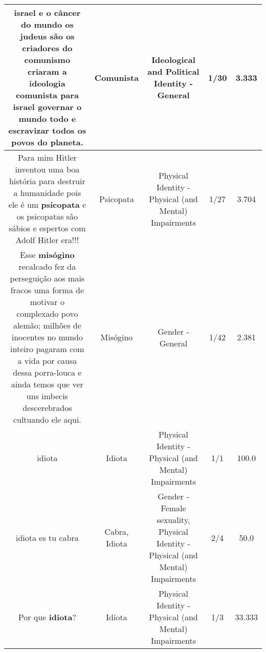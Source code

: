 \documentclass[11pt]{article}
\newlength\mylength
\begin{document}
\begin{center}
\begin{longtable}{|C{.65\mylength}|C{.30\mylength}|C{.12\mylength}|C{.12\mylength}|C{.12\mylength}|}
  \small israel e o câncer do mundo os judeus são os criadores do comunismo criaram a ideologia \textbf{comunista} para israel governar o mundo todo e escravizar todos os povos do planeta.\normalsize   & Comunista & Ideological and Political Identity - General & 1/30 & 3.333 \\  \hline
  \small Para mim Hitler inventou uma boa história para destruir a humanidade pois ele é um \textbf{psicopata} e os psicopatas são sábios e espertos com Adolf Hitler era!!!\normalsize   & Psicopata & Physical Identity - Physical (and Mental) Impairments & 1/27 & 3.704 \\  \hline
  \small Esse \textbf{misógino} recalcado fez da perseguição aos mais fracos uma forma de motivar o complexado povo alemão; milhões de inocentes no mundo inteiro pagaram com a vida por causa dessa porra-louca e ainda temos que ver uns imbecis descerebrados cultuando ele aqui.\normalsize   & Misógino & Gender - General & 1/42 & 2.381 \\  \hline
  \small idiota\normalsize   & Idiota & Physical Identity - Physical (and Mental) Impairments & 1/1 & 100.0 \\  \hline
  \small idiota es tu cabra\normalsize   & Cabra, Idiota & Gender - Female sexuality, Physical Identity - Physical (and Mental) Impairments & 2/4 & 50.0 \\  \hline
  \small Por que \textbf{idiota}?\normalsize   & Idiota & Physical Identity - Physical (and Mental) Impairments & 1/3 & 33.333 \\  \hline

\end{longtable}
\end{center}
\end{document}
